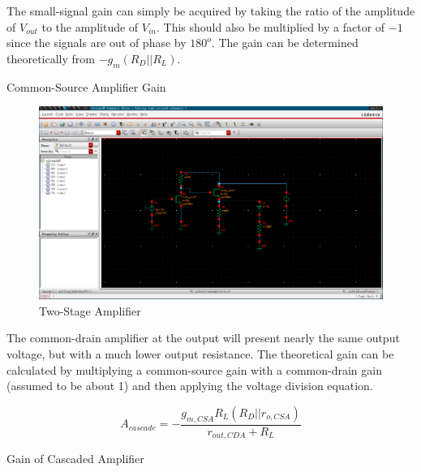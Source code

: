 \FloatBarrier

The small-signal gain can simply be acquired by taking the ratio of the amplitude of $V_{out}$ to the amplitude of $V_{in}$. This should also be multiplied by a factor of $-1$ since the signals are out of phase by $180^{o}$.
The gain can be determined theoretically from $-g_{m} ( R_{D} || R_{L} )$.


\FloatBarrier

\begin{table}[h!]
	\centering
	\caption{Common-Source Amplifier Gain}
	\label{tab:common_source_amp_gain}
\end{table}

\FloatBarrier


\FloatBarrier

\begin{figure}[h!]
	\centering
	\includegraphics[scale=0.45]{../images/circuit6.PNG}
	\caption{Two-Stage Amplifier}
	\label{fig:circuit6}
\end{figure}

\FloatBarrier

The common-drain amplifier at the output will present nearly the same output voltage, but with a much lower output resistance.
The theoretical gain can be calculated by multiplying a common-source gain with a common-drain gain (assumed to be about 1) and then applying the voltage division equation.

\begin{equation}
	\label{eq:theoretical_cascaded_gain}
	A_{cascade} = -\frac{ g_{m,CSA} R_{L} ( R_{D} || r_{o,CSA} ) }{ r_{out,CDA} + R_{L} }
\end{equation}

\FloatBarrier

\begin{table}[h!]
	\centering
	\caption{Gain of Cascaded Amplifier}
	\label{tab:cascade_gain}
\end{table}

\FloatBarrier
